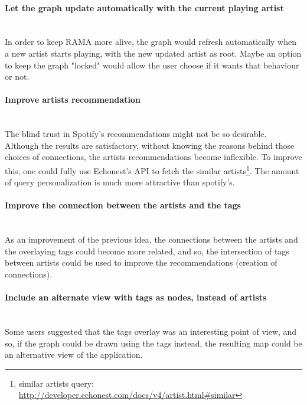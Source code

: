   \paragraph*{Let the graph update automatically with the current playing artist} \hfill \\
  \indent In order to keep RAMA more alive, the graph would refresh automatically when a new artist starts playing, with the new updated artist as root.
  Maybe an option to keep the graph "locked" would allow the user choose if it wants that behaviour or not.

  \paragraph*{Improve artists recommendation} \hfill \\
  \indent The blind trust in Spotify's recommendations might not be so desirable.
  Although the results are satisfactory, without knowing the reasons behind those choices of connections, the artists recommendations become inflexible.
  To improve this, one could fully use Echonest's API to fetch the similar artists\footnote{similar artists query: \url{http://developer.echonest.com/docs/v4/artist.html\#similar}}.
  The amount of query personalization is much more attractive than spotify's. \\

  \paragraph*{Improve the connection between the artists and the tags} \hfill \\
  \indent As an improvement of the previous idea, the connections between the artists and the overlaying tags could become more related, and so, the intersection of tags between artists could be used to improve the recommendations (creation of connections).  \\

  \paragraph*{Include an alternate view with tags as nodes, instead of artists} \hfill \\
  \indent Some users suggested that the tags overlay was an interesting point of view, and so, if the graph could be drawn using the tags instead, the resulting map could be an alternative view of the application. \\

